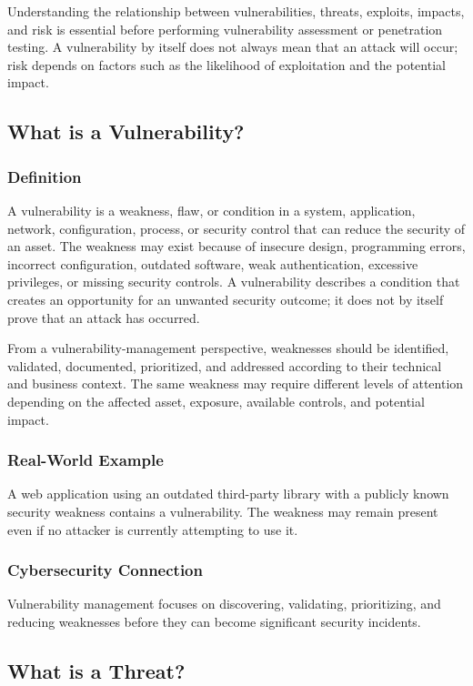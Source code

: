 \documentclass[11pt,a4paper]{article}
\begin{document}
Understanding the relationship between vulnerabilities, threats, exploits, impacts, and risk is essential before performing vulnerability assessment or penetration testing. A vulnerability by itself does not always mean that an attack will occur; risk depends on factors such as the likelihood of exploitation and the potential impact.

\subsection{What is a Vulnerability?}
\subsubsection{Definition}
A vulnerability is a weakness, flaw, or condition in a system, application, network, configuration, process, or security control that can reduce the security of an asset. The weakness may exist because of insecure design, programming errors, incorrect configuration, outdated software, weak authentication, excessive privileges, or missing security controls. A vulnerability describes a condition that creates an opportunity for an unwanted security outcome; it does not by itself prove that an attack has occurred.

From a vulnerability-management perspective, weaknesses should be identified, validated, documented, prioritized, and addressed according to their technical and business context. The same weakness may require different levels of attention depending on the affected asset, exposure, available controls, and potential impact.

\subsubsection{Real-World Example}
A web application using an outdated third-party library with a publicly known security weakness contains a vulnerability. The weakness may remain present even if no attacker is currently attempting to use it.

\subsubsection{Cybersecurity Connection}
Vulnerability management focuses on discovering, validating, prioritizing, and reducing weaknesses before they can become significant security incidents.

\subsection{What is a Threat?}
\end{document}
